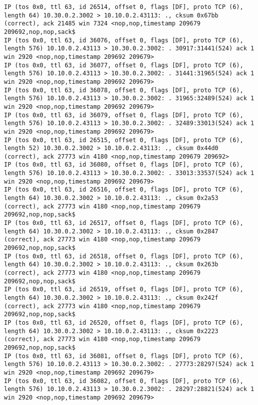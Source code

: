 \documentclass[a4paper,12pt]{article}
\begin{document}
\begin{lstlisting}
IP (tos 0x0, ttl 63, id 26514, offset 0, flags [DF], proto TCP (6), length 64) 10.30.0.2.3002 > 10.10.0.2.43113: ., cksum 0x67bb (correct), ack 21485 win 7324 <nop,nop,timestamp 209679 209692,nop,nop,sack$
IP (tos 0x0, ttl 63, id 36076, offset 0, flags [DF], proto TCP (6), length 576) 10.10.0.2.43113 > 10.30.0.2.3002: . 30917:31441(524) ack 1 win 2920 <nop,nop,timestamp 209692 209679>
IP (tos 0x0, ttl 63, id 36077, offset 0, flags [DF], proto TCP (6), length 576) 10.10.0.2.43113 > 10.30.0.2.3002: . 31441:31965(524) ack 1 win 2920 <nop,nop,timestamp 209692 209679>
IP (tos 0x0, ttl 63, id 36078, offset 0, flags [DF], proto TCP (6), length 576) 10.10.0.2.43113 > 10.30.0.2.3002: . 31965:32489(524) ack 1 win 2920 <nop,nop,timestamp 209692 209679>
IP (tos 0x0, ttl 63, id 36079, offset 0, flags [DF], proto TCP (6), length 576) 10.10.0.2.43113 > 10.30.0.2.3002: . 32489:33013(524) ack 1 win 2920 <nop,nop,timestamp 209692 209679>
IP (tos 0x0, ttl 63, id 26515, offset 0, flags [DF], proto TCP (6), length 52) 10.30.0.2.3002 > 10.10.0.2.43113: ., cksum 0x44d0 (correct), ack 27773 win 4180 <nop,nop,timestamp 209679 209692>
IP (tos 0x0, ttl 63, id 36080, offset 0, flags [DF], proto TCP (6), length 576) 10.10.0.2.43113 > 10.30.0.2.3002: . 33013:33537(524) ack 1 win 2920 <nop,nop,timestamp 209692 209679>
IP (tos 0x0, ttl 63, id 26516, offset 0, flags [DF], proto TCP (6), length 64) 10.30.0.2.3002 > 10.10.0.2.43113: ., cksum 0x2a53 (correct), ack 27773 win 4180 <nop,nop,timestamp 209679 209692,nop,nop,sack$
IP (tos 0x0, ttl 63, id 26517, offset 0, flags [DF], proto TCP (6), length 64) 10.30.0.2.3002 > 10.10.0.2.43113: ., cksum 0x2847 (correct), ack 27773 win 4180 <nop,nop,timestamp 209679 209692,nop,nop,sack$
IP (tos 0x0, ttl 63, id 26518, offset 0, flags [DF], proto TCP (6), length 64) 10.30.0.2.3002 > 10.10.0.2.43113: ., cksum 0x263b (correct), ack 27773 win 4180 <nop,nop,timestamp 209679 209692,nop,nop,sack$
IP (tos 0x0, ttl 63, id 26519, offset 0, flags [DF], proto TCP (6), length 64) 10.30.0.2.3002 > 10.10.0.2.43113: ., cksum 0x242f (correct), ack 27773 win 4180 <nop,nop,timestamp 209679 209692,nop,nop,sack$
IP (tos 0x0, ttl 63, id 26520, offset 0, flags [DF], proto TCP (6), length 64) 10.30.0.2.3002 > 10.10.0.2.43113: ., cksum 0x2223 (correct), ack 27773 win 4180 <nop,nop,timestamp 209679 209692,nop,nop,sack$
IP (tos 0x0, ttl 63, id 36081, offset 0, flags [DF], proto TCP (6), length 576) 10.10.0.2.43113 > 10.30.0.2.3002: . 27773:28297(524) ack 1 win 2920 <nop,nop,timestamp 209692 209679>
IP (tos 0x0, ttl 63, id 36082, offset 0, flags [DF], proto TCP (6), length 576) 10.10.0.2.43113 > 10.30.0.2.3002: . 28297:28821(524) ack 1 win 2920 <nop,nop,timestamp 209692 209679>

\end{lstlisting}
\end{document}
